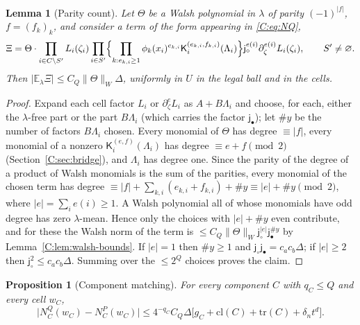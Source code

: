 \documentclass[11pt]{article}
\newtheorem{lemma}[lemma]{Lemma}
\newtheorem{proposition}[proposition]{Proposition}
\newcommand{\E}{\mathbb{E}}
\newcommand{\norm}[1]{\lVert #1\rVert}
\newcommand{\abs}[1]{\lvert #1\rvert}
\newcommand{\jsh}{\mathsf{j}_\circ}
\newcommand{\jfi}{\mathsf{j}_\bullet}
\newcommand{\K}{\mathsf{K}}
\begin{document}
\begin{lemma}[Parity count]\label{C:lem:parity}
Let \(\Theta\) be a Walsh polynomial in \(\lambda\) of parity
\((-1)^{\abs f}\), \(f=(f_k)_k\), and consider a term of the form
appearing in \eqref{C:eq:NQ},
\[
 \Xi=\Theta\cdot\prod_{i\in C\setminus S'}L_i(\zeta_i)\prod_{i\in S'}
 \Bigl\{\prod_{k:e_{k,i}\ge1}\phi_k(x_i)^{e_{k,i}}\K_i^{(e_{k,i},f_{k,i})}(\Lambda_i)\Bigr\}
 \jsh^{e(i)}\partial_\zeta^{e(i)}L_i(\zeta_i),\qquad S'\ne\varnothing .
\]
Then \(\abs{\E_\lambda\Xi}\le C_Q\norm\Theta_W\Delta\), uniformly in \(U\) in
the legal ball and in the cells.
\end{lemma}
\begin{proof}
Expand each cell factor \(L_i\) or \(\partial_\zeta^{e}L_i\) as
\(A+B\Lambda_i\) and choose, for each, either the \(\lambda\)-free part or
the part \(B\Lambda_i\) (which carries the factor \(\jfi\)); let \(\#y\) be
the number of factors \(B\Lambda_i\) chosen.  Every monomial of \(\Theta\)
has degree \(\equiv\abs f\), every monomial of a nonzero
\(\K_i^{(e,f)}(\Lambda_i)\) has degree \(\equiv e+f\pmod2\) (Section~\ref{C:sec:bridge}),
and \(\Lambda_i\) has degree one.  Since the parity of the degree of a
product of Walsh monomials is the sum of the parities, every monomial of
the chosen term has degree \(\equiv\abs f+\sum_{k,i}(e_{k,i}+f_{k,i})+\#y
\equiv\abs e+\#y\pmod2\), where \(\abs e=\sum_ie(i)\ge1\).  A Walsh polynomial
all of whose monomials have odd degree has zero \(\lambda\)-mean.  Hence
only the choices with \(\abs e+\#y\) even contribute, and for these the
Walsh norm of the term is \(\le C_Q\norm\Theta_W\jsh^{\abs e}\jfi^{\#y}\) by
Lemma~\ref{C:lem:walsh-bounds}.  If \(\abs e=1\) then \(\#y\ge1\) and
\(\jsh\jfi=c_ac_b\Delta\); if \(\abs e\ge2\) then \(\jsh^2\le c_ac_b\Delta\).
Summing over the \(\le2^{Q}\) choices proves the claim.
\end{proof}

\begin{proposition}[Component matching]\label{C:prop:matching}
For every component \(C\) with \(q_C\le Q\) and every cell \(w_C\),
\begin{equation}
 \abs{N^Q_C(w_C)-N^P_C(w_C)}\le4^{-q_C}C_Q\Delta\bigl[g_C+\mathrm{cl}(C)+\mathrm{tr}(C)+\delta_nt^d\bigr].
 \label{C:eq:matching}
\end{equation}
\end{proposition}
\end{document}

